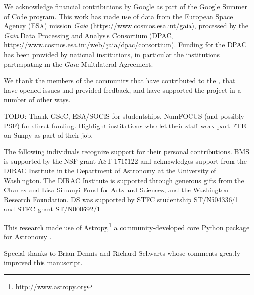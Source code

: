 \acknowledgments

We acknowledge financial contributions by Google as part of the Google Summer of Code program.
This work has made use of data from the European Space Agency (ESA) mission {\it Gaia} (\url{https://www.cosmos.esa.int/gaia}), processed by the {\it Gaia} Data Processing and Analysis Consortium (DPAC, \url{https://www.cosmos.esa.int/web/gaia/dpac/consortium}).
Funding for the DPAC has been provided by national institutions, in particular the institutions participating in the {\it Gaia} Multilateral Agreement.

We thank the members of the community that have contributed to the \sunpyproj, that have opened issues and provided feedback, and have supported the project in a number of other ways.

TODO: Thank GSoC, ESA/SOCIS for studentships, NumFOCUS (and possibly PSF) for direct funding.
Highlight institutions who let their staff work part FTE on Sunpy as part of their job.

The following individuals recognize support for their personal contributions.
BMS is supported by the NSF grant AST-1715122 and acknowledges support from the DIRAC Institute in the Department of Astronomy at the University of Washington.
The DIRAC Institute is supported through generous gifts from the Charles and Lisa Simonyi Fund for Arts and Sciences, and the Washington Research Foundation.
DS was supported by STFC studentship ST/N504336/1 and STFC grant ST/N000692/1.

This research made use of Astropy,\footnote{http://www.astropy.org} a community-developed core Python package for Astronomy \citep{astropy2013, astropy2018}.

Special thanks to Brian Dennis and Richard Schwarts whose comments greatly improved this manuscript.




